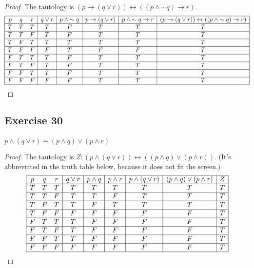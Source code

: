 \documentclass[14pt]{extarticle}
\newcommand{\bic}{\leftrightarrow}
\begin{document}
\begin{proof}
The tautology is $(p \to (q \vee r)) \bic ((p \wedge {\sim q}) \to r)$.
$$
\begin{array}{|ccc|c|c|c|c|c|c|}
\hline
p & q & r & q \vee r & p \wedge {\sim q} & p \to (q \vee r) & p \wedge {\sim q}
\to r & (p \to (q \vee r)) \bic ((p \wedge {\sim q}) \to r) \\
\hline
T & T & T & T & F & T & T & T \\
\hline
T & T & F & T & F & T & T & T \\
\hline
T & F & T & T & T & T & T & T \\
\hline
T & F & F & F & T & F & F & T \\
\hline
F & T & T & T & F & T & T & T \\
\hline
F & T & F & T & F & T & T & T \\
\hline
F & F & T & T & F & T & T & T \\
\hline
F & F & F & F & F & T & T & T \\
\hline
\end{array}
$$
\end{proof}

\subsection{Exercise 30}
$p \wedge (q \vee r) \equiv (p \wedge q) \vee (p \wedge r)$

\begin{proof}
The tautology is $Z: (p \wedge (q \vee r)) \bic ((p \wedge q) \vee (p \wedge
r))$. (It's abbreviated in the truth table below, because it does not fit the
screen.)
$$
\begin{array}{|ccc|c|c|c|c|c|c|}
\hline
p & q & r & q \vee r & p \wedge q & p \wedge r & p \wedge (q \vee r) & (p \wedge
q) \vee (p \wedge r) & Z \\
\hline
T & T & T & T & T & T & T & T & T \\
\hline
T & T & F & T & T & F & T & T & T \\
\hline
T & F & T & T & F & T & T & T & T \\
\hline
T & F & F & F & F & F & F & F & T \\
\hline
F & T & T & T & F & F & F & F & T \\
\hline
F & T & F & T & F & F & F & F & T \\
\hline
F & F & T & T & F & F & F & F & T \\
\hline
F & F & F & F & F & F & F & F & T \\
\hline
\end{array}
$$
\end{proof}
\end{document}
